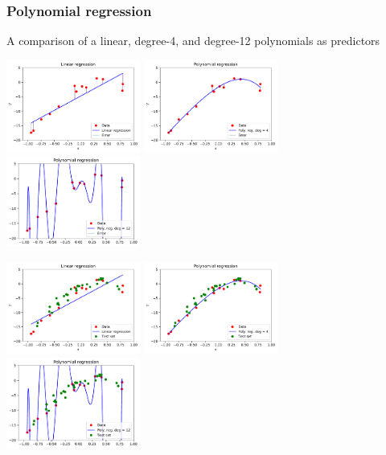 \documentclass[notes]{beamer}          %
\begin{document}
\begin{frame}
\frametitle{Polynomial regression}
    A comparison of a linear, degree-4, and degree-12 polynomials as predictors
    \begin{center}
        \includegraphics[width=0.33\textwidth]{figures/week_2/linear_regression_error.pdf}
        \includegraphics[width=0.33\textwidth]{figures/week_2/polynomial_regression_degree_4.pdf}
        \includegraphics[width=0.33\textwidth]{figures/week_2/polynomial_regression_degree_12.pdf}
    \end{center}
    \pause
    \begin{center}
        \includegraphics[width=0.33\textwidth]{figures/week_2/linear_regression_test_set.pdf}
        \includegraphics[width=0.33\textwidth]{figures/week_2/polynomial_regression_degree_4_test_set.pdf}
        \includegraphics[width=0.33\textwidth]{figures/week_2/polynomial_regression_degree_12_test_set.pdf}
    \end{center}
\end{frame}
\end{document}
